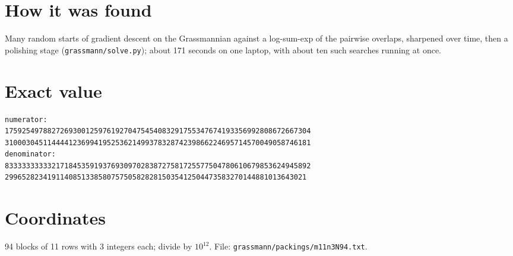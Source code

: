\documentclass[11pt,a4paper]{article}
\begin{document}
\section{How it was found}
Many random starts of gradient descent on the Grassmannian against a log-sum-exp of the pairwise overlaps, sharpened over time, then a polishing stage (\texttt{grassmann/solve.py}); about 171 seconds on one laptop, with about ten such searches running at once.


\appendix
\section{Exact value}
{\small
\begin{verbatim}
numerator:
175925497882726930012597619270475454083291755347674193356992808672667304
310003045114444123699419525362149937832874239866224695714570049058746181
denominator:
833333333332171845359193769309702838727581725577504780610679853624945892
29965282341911408513385807575058282815035412504473583270144881013643021
\end{verbatim}}

\section{Coordinates}
94 blocks of 11 rows with 3 integers each; divide by $10^{12}$. File: \texttt{grassmann/packings/m11n3N94.txt}.
{\tiny
\begin{multicols}{3}
\end{multicols}}
\end{document}
